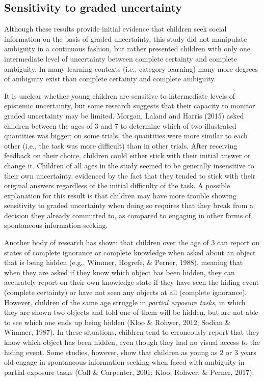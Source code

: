 \documentclass[floatsintext,man]{apa6}
\theoremstyle{definition}
\theoremstyle{definition}
\theoremstyle{definition}
\theoremstyle{remark}
\begin{document}
\subsection{Sensitivity to graded
uncertainty}\label{sensitivity-to-graded-uncertainty}

Although these results provide initial evidence that children seek
social information on the basis of graded uncertainty, this study did
not manipulate ambiguity in a continuous fashion, but rather presented
children with only one intermediate level of uncertainty between
complete certainty and complete ambiguity. In many learning contexts
(i.e., category learning) many more degrees of ambiguity exist than
complete certainty and complete ambiguity.

It is unclear whether young children are sensitive to intermediate
levels of epistemic uncertainty, but some research suggests that their
capacity to monitor graded uncertainty may be limited. Morgan, Laland
and Harris (2015) asked children between the ages of 3 and 7 to
determine which of two illustrated quantities was bigger; on some
trials, the quantities were more similar to each other (i.e., the task
was more difficult) than in other trials. After receiving feedback on
their choice, children could either stick with their initial answer or
change it. Children of all ages in the study seemed to be generally
insensitive to their own uncertainty, evidenced by the fact that they
tended to stick with their original answers regardless of the initial
difficulty of the task. A possible explanation for this result is that
children may have more trouble showing sensitivity to graded uncertainty
when doing so requires that they break from a decision they already
committed to, as compared to engaging in other forms of spontaneous
information-seeking.

Another body of research has shown that children over the age of 3 can
report on states of complete ignorance or complete knowledge when asked
about an object that is being hidden (e.g., Wimmer, Hogrefe, \& Perner,
1988), meaning that when they are asked if they know which object has
been hidden, they can accurately report on their own knowledge state if
they have seen the hiding event (complete certainty) or have not seen
any objects at all (complete ignorance). However, children of the same
age struggle in \emph{partial exposure tasks}, in which they are shown
two objects and told one of them will be hidden, but are not able to see
which one ends up being hidden (Kloo \& Rohwer, 2012; Sodian \& Wimmer,
1987). In these situations, children tend to erroneously report that
they know which object has been hidden, even though they had no visual
access to the hiding event. Some studies, however, show that children as
young as 2 or 3 years old engage in spontaneous information-seeking when
faced with ambiguity in partial exposure tasks (Call \& Carpenter, 2001;
Kloo, Rohwer, \& Perner, 2017).
\end{document}

